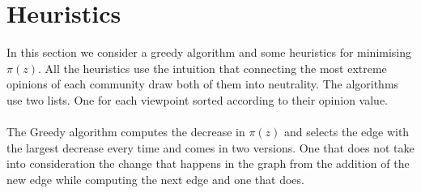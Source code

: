 \section{Heuristics}
\label{sec:heuristics}

In this section we  consider a greedy algorithm and some heuristics for minimising $\pi(z)$. All the heuristics use the intuition that connecting the most extreme opinions of each community draw both of them into neutrality. The algorithms use two lists. One for each viewpoint sorted according to their opinion value. 
\\
\\
The Greedy algorithm computes the decrease in $\pi(z)$ and selects the edge with the largest decrease every time and comes in two versions. One that does not take into consideration the change that happens in the graph from the addition of the new edge while computing the next edge and one that does.
\\
